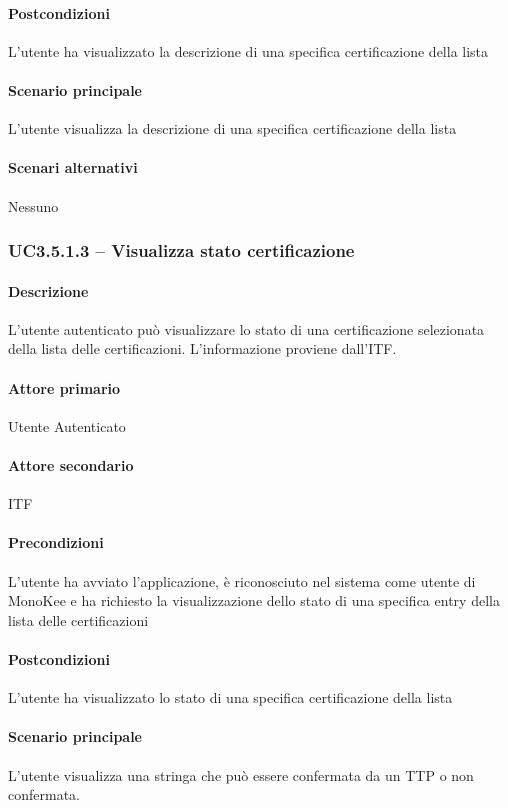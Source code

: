 \paragraph{Postcondizioni}  L’utente ha visualizzato la descrizione di una specifica certificazione della lista
\paragraph{Scenario principale}  
L’utente visualizza la descrizione di una specifica certificazione della lista
\paragraph{Scenari alternativi}  Nessuno



\subsubsection{UC3.5.1.3 – Visualizza stato certificazione}
\paragraph{Descrizione}  L’utente autenticato può visualizzare lo stato di una certificazione selezionata della lista delle certificazioni. L’informazione proviene dall’ITF.
\paragraph{Attore primario}  Utente Autenticato
\paragraph{Attore secondario}  ITF
\paragraph{Precondizioni} L’utente ha avviato l’applicazione, è riconosciuto nel sistema come utente di MonoKee e ha richiesto la visualizzazione dello stato di una specifica entry della lista delle certificazioni
\paragraph{Postcondizioni}  L’utente ha visualizzato lo stato di una specifica certificazione della lista
\paragraph{Scenario principale}  
L’utente visualizza una stringa che può essere confermata da un TTP o non confermata.
